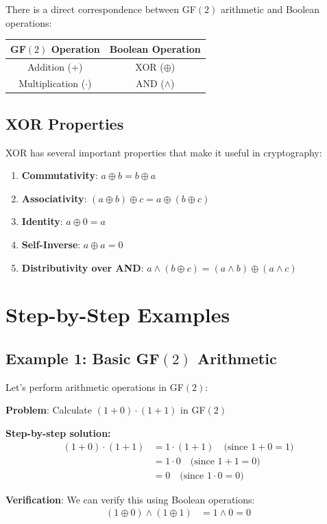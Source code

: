 \documentclass[11pt,a4paper]{article}
\begin{document}
There is a direct correspondence between GF$(2)$ arithmetic and Boolean operations:

\begin{center}
\begin{tabular}{|c|c|}
\hline
\textbf{GF$(2)$ Operation} & \textbf{Boolean Operation} \\
\hline
Addition (+) & XOR ($\oplus$) \\
Multiplication ($\cdot$) & AND ($\wedge$) \\
\hline
\end{tabular}
\end{center}

\subsection{XOR Properties}

XOR has several important properties that make it useful in cryptography:

\begin{enumerate}
    \item \textbf{Commutativity}: $a \oplus b = b \oplus a$
    \item \textbf{Associativity}: $(a \oplus b) \oplus c = a \oplus (b \oplus c)$
    \item \textbf{Identity}: $a \oplus 0 = a$
    \item \textbf{Self-Inverse}: $a \oplus a = 0$
    \item \textbf{Distributivity over AND}: $a \wedge (b \oplus c) = (a \wedge b) \oplus (a \wedge c)$
\end{enumerate}

\section{Step-by-Step Examples}

\subsection{Example 1: Basic GF$(2)$ Arithmetic}

Let's perform arithmetic operations in GF$(2)$:

\begin{examplebox}
\textbf{Problem}: Calculate $(1 + 0) \cdot (1 + 1)$ in GF$(2)$

\textbf{Step-by-step solution:}
\begin{align*}
(1 + 0) \cdot (1 + 1) &= 1 \cdot (1 + 1) \quad \text{(since } 1 + 0 = 1\text{)} \\
&= 1 \cdot 0 \quad \text{(since } 1 + 1 = 0\text{)} \\
&= 0 \quad \text{(since } 1 \cdot 0 = 0\text{)}
\end{align*}

\textbf{Verification}: We can verify this using Boolean operations:
\begin{align*}
(1 \oplus 0) \wedge (1 \oplus 1) &= 1 \wedge 0 = 0
\end{align*}
\end{examplebox}
\end{document}
